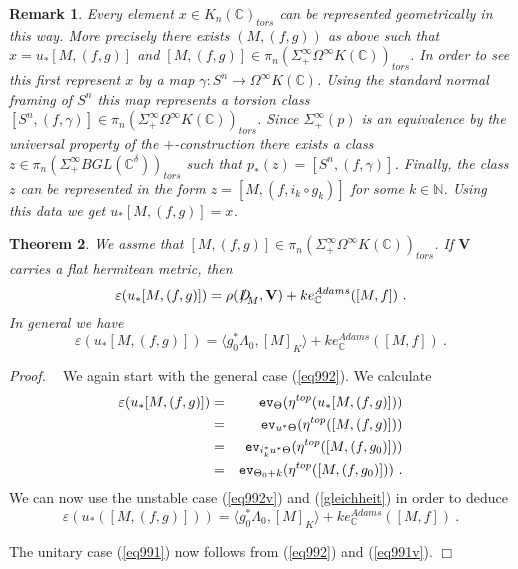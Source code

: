 \documentclass[12pt]{article}
\newtheorem{theorem}{Theorem}[section]
\newtheorem{rem}[theorem]{Remark}
\newcommand{\ev}{{\tt ev}}
\def\hB{\hspace*{\fill}$\Box$ \newline\noindent}
\newcommand{\proof}{{\it Proof.$\:\:\:\:$}}
\newcommand{\nat}{{\mathbb{N}}}
\newcommand{\C}{{\mathbb{C}}}
\newcommand{\bV}{{\mathbf{V}}}
\newcommand{\Dirac}{{D\hspace{-0.27cm}/}}
\begin{document}
\begin{rem}{\rm
Every element $x\in K_{n}(\C)_{tors}
$ can be represented geometrically in this way.  More precisely
 there exists $(M,(f,g))$ as above such that
$x=u_{*}[M,(f,g)]$ and $[M,(f,g)]\in \pi_{n}(\Sigma^{\infty}_{+}  \Omega^{\infty}K(\C))_{tors}$.
In order to see this first represent $x$ by a map
$\gamma:S^{n}\to \Omega^{\infty} K(\C)$. Using the standard normal framing  of $S^{n}$ this map represents 
a torsion class $[S^{n},(f,\gamma)]\in \pi_{n}(\Sigma^{\infty}_{+} \Omega^{\infty} K(\C))_{tors}$. Since $\Sigma_{+}^{\infty}(p)$
is an equivalence by the universal property of the $+$-construction there exists a class
$z\in \pi_{n}(\Sigma^{\infty}_{+} BGL(\C^{\delta}))_{tors}$ such that
$p_{*}(z)=[S^{n},(f,\gamma)]$. Finally, the class $z$ can be represented in the form
$z=[M,(f,i_{k}\circ g_{k})]$ for some $k\in \nat$. Using this data we get
$u_{*}[M,(f,g)]=x$. 
}
\end{rem}

 


\begin{theorem}\label{them1000v} 
We assme that $[M,(f,g)]\in \pi_{n}(\Sigma^{\infty}_{+}  \Omega^{\infty}K(\C))_{tors}$.
 If $\bV$ carries a flat hermitean metric, then
\begin{equation}\label{eq991}
\varepsilon(u_{*}[M,(f,g)])=\rho(\Dirac_{M},\bV)+k e^{Adams}_{\C}([M,f]) \ .
\end{equation}
In general we have  
\begin{equation}\label{eq992}
\varepsilon(u_{*}[M,(f,g)])=\langle g_{0}^{*}\Lambda_{0} , [M]_{K}\rangle+ke^{Adams}_{\C}([M,f])\ . \end{equation}
 \end{theorem}
\proof
We again start with the general case (\ref{eq992}).
We calculate
\begin{eqnarray}\varepsilon(u_{*}[M,(f,g)])&=&\ev_{\Theta}(\eta^{top}(u_{*}[M,(f,g)]))\label{calghgiue}
 \\&=&\ev_{u^{*}\Theta}(\eta^{top}([M,(f,g)]))\nonumber\\&=&\ev_{ i_{k}^{*}u^{*}\Theta } ( \eta^{top}([M,(f,g_{0})]) ) \nonumber\\& =&\ev_{ \Theta_{0}+k}(\eta^{top}([M,(f,g_{0})]))\nonumber \ .\end{eqnarray}  We can now use the unstable case (\ref{eq992v}) and (\ref{gleichheit}) in order to deduce
 $$\varepsilon(u_{*}([M,(f,g)]))=\langle g^{*}_{0}\Lambda_{0}, [M]_{K}\rangle+ke^{Adams}_{\C}([M,f])\ .$$


The unitary case (\ref{eq991}) now follows from (\ref{eq992}) and (\ref{eq991v}). \hB  
 
\end{document}
